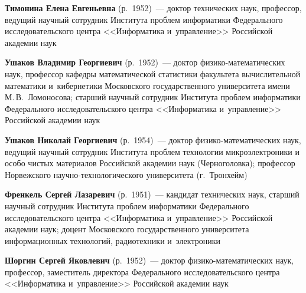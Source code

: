 \begin{multicols}{2}
\noindent
\textbf{Тимонина Елена Евгеньевна} (р.\ 1952)~--- 
доктор технических наук, профессор, ведущий научный сотруд\-ник 
Института проб\-лем информатики 
Федерального исследовательского центра <<Информатика и~управ\-ление>> 
Российской академии наук

\noindent
\textbf{Ушаков Владимир Георгиевич} (р.\ 1952)~--- 
доктор фи\-зи\-ко-ма\-те\-ма\-ти\-че\-ских наук, 
профессор кафедры математической статистики факультета вычислительной математики 
и~кибернетики Московского государственного университета имени М.\,В.~Ломоносова; 
старший научный сотрудник Института проб\-лем информатики Федерального исследовательского 
центра <<Информатика и~управ\-ле\-ние>> Российской академии наук

 
\noindent
\textbf{Ушаков Николай Георгиевич} (р.\ 1954)~---
доктор фи\-зи\-ко-ма\-те\-ма\-ти\-че\-ских наук, ведущий научный сотруд\-ник 
Института проблем технологии микроэлектроники и особо чистых материалов 
Российской академии наук (Черноголовка); профессор Норвежского 
на\-уч\-но-тех\-но\-ло\-ги\-че\-ско\-го университета (г.\ Тронхейм)

\noindent
\textbf{Френкель Сергей Лазаревич} (р.\ 1951)~---
кандидат технических наук, старший научный сотрудник\linebreak 
Института проб\-лем информатики 
Федерального исследовательского центра <<Информатика и~управ\-ле\-ние>> 
Российской академии наук; 
доцент Московского государственного университета информационных технологий,
радиотехники и~электроники

\noindent
\textbf{Шоргин Сергей Яковлевич} (р.\ 1952)~---
доктор фи\-зи\-ко-ма\-те\-ма\-ти\-че\-ских наук, профессор, заместитель директора 
Федерального исследовательского цент\-ра <<Информатика и~управ\-ле\-ние>> 
Российской академии наук




 \label{end\stat}










\end{multicols}

\newpage